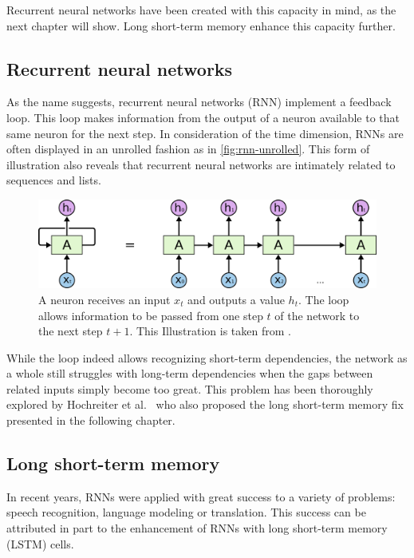 Recurrent neural networks have been created with this capacity in mind, as the next chapter will show. Long short-term memory enhance this capacity further.

\subsection{Recurrent neural networks}\label{sec:recurrent-networks}
As the name suggests, recurrent neural networks (RNN) implement a feedback loop. This loop makes information from the output of a neuron available to that same neuron for the next step. In consideration of the time dimension, RNNs are often displayed in an unrolled fashion as in \autoref{fig:rnn-unrolled}. This form of illustration also reveals that recurrent neural networks are intimately related to sequences and lists.

\begin{figure}
    \centering
    \includegraphics[width=.9\textwidth]{gfx/rnn-unrolled.png}
    \caption{A neuron receives an input $x_t$ and outputs a value $h_t$. The loop allows information to be passed from one step $t$ of the network to the next step $t+1$. This Illustration is taken from \cite{web:colah}.}
    \label{fig:rnn-unrolled}
\end{figure}

While the loop indeed allows recognizing short-term dependencies, the network as a whole still struggles with long-term dependencies when the gaps between related inputs simply become too great. This problem has been thoroughly explored by Hochreiter et al.~\cite{hochreiter1991untersuchungen} who also proposed the long short-term memory fix presented in the following chapter.

\subsection{Long short-term memory}\label{sec:lstm}
In recent years, RNNs were applied with great success to a variety of problems: speech recognition, language modeling or translation. This success can be attributed in part to the enhancement of RNNs with long short-term memory (LSTM) cells.

